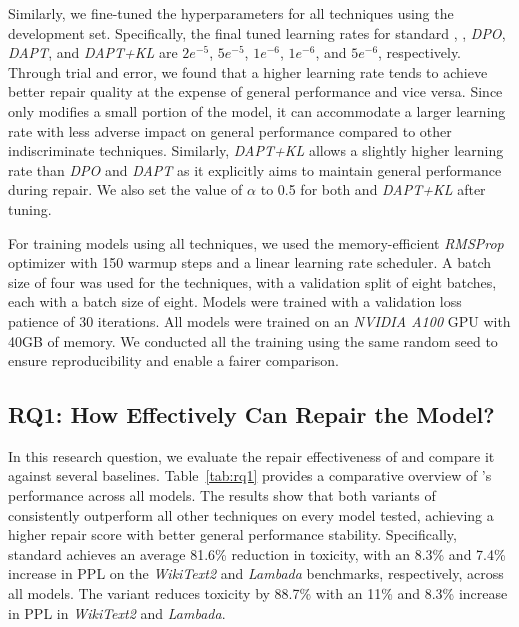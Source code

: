 Similarly, we fine-tuned the hyperparameters for all techniques using the development set. Specifically, the final tuned learning rates for standard \nick, \nickkl, \textit{DPO}, \textit{DAPT}, and \textit{DAPT+KL} are $2e^{-5}$, $5e^{-5}$, $1e^{-6}$, $1e^{-6}$, and $5e^{-6}$, respectively. Through trial and error, we found that a higher learning rate tends to achieve better repair quality at the expense of general performance and vice versa. Since \nick only modifies a small portion of the model, it can accommodate a larger learning rate with less adverse impact on general performance compared to other indiscriminate techniques. Similarly, \textit{DAPT+KL} allows a slightly higher learning rate than \textit{DPO} and \textit{DAPT} as it explicitly aims to maintain general performance during repair. We also set the value of $\alpha$ to 0.5 for both \nick and \textit{DAPT+KL} after tuning.

For training models using all techniques, we used the memory-efficient \textit{RMSProp} optimizer with 150 warmup steps and a linear learning rate scheduler. A batch size of four was used for the techniques, with a validation split of eight batches, each with a batch size of eight. Models were trained with a validation loss patience of 30 iterations. All models were trained on an \textit{NVIDIA A100} GPU with 40GB of memory. We conducted all the training using the same random seed to ensure reproducibility and enable a fairer comparison.
 


\subsection{RQ1: How Effectively Can \nick Repair the Model?}
\label{sec:rq1}



In this research question, we evaluate the repair effectiveness of \nick and compare it against several baselines. Table~\ref{tab:rq1} provides a comparative overview of \nick's performance across all models. The results show that both variants of \nick consistently outperform all other techniques on every model tested, achieving a higher repair score with better general performance stability. Specifically, standard \nick achieves an average 81.6\% reduction in toxicity, with an 8.3\% and 7.4\% increase in PPL on the \textit{WikiText2} and \textit{Lambada} benchmarks, respectively, across all models. The \nickkl variant reduces toxicity by 88.7\% with an 11\% and 8.3\% increase in PPL in \textit{WikiText2} and \textit{Lambada}. 

